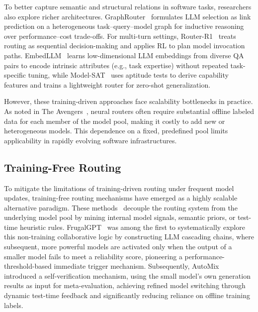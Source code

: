 \documentclass[acmsmall,screen,review,anonymous]{acmart}
\begin{document}
To better capture semantic and structural relations in software tasks, researchers also explore richer architectures. GraphRouter~\cite{feng2024graphrouter}
formulates LLM selection as link prediction on a heterogeneous task--query--model graph for inductive reasoning over performance--cost trade-offs.
For multi-turn settings, Router-R1~\cite{zhang2025router} treats routing as sequential decision-making and applies RL to plan model invocation paths.
EmbedLLM~\cite{zhuang2024embedllm} learns low-dimensional LLM embeddings from diverse QA pairs to encode intrinsic attributes (e.g., task expertise)
without repeated task-specific tuning, while Model-SAT~\cite{zhang2025capability} uses aptitude tests to derive capability features and trains a lightweight
router for zero-shot generalization.

However, these training-driven approaches face scalability bottlenecks in practice. As noted in The Avengers~\cite{zhang2025avengers}, neural routers often
require substantial offline labeled data for each member of the model pool, making it costly to add new or heterogeneous models. This dependence on a fixed,
predefined pool limits applicability in rapidly evolving software infrastructures.

\subsection{Training-Free Routing}
To mitigate the limitations of training-driven routing under frequent model updates, training-free routing mechanisms have emerged as a highly scalable alternative paradigm. These methods~\cite{wu2025efficient,guha2024smoothie,chen2025tagrouter} decouple the routing system from the underlying model pool by mining internal model signals, semantic priors, or test-time heuristic rules. FrugalGPT~\cite{chen2023frugalgpt} was among the first to systematically explore this non-training collaborative logic by constructing LLM cascading chains, where subsequent, more powerful models are activated only when the output of a smaller model fails to meet a reliability score, pioneering a performance-threshold-based immediate trigger mechanism. Subsequently, AutoMix~\cite{aggarwal2024automix} introduced a self-verification mechanism, using the small model's own generation results as input for meta-evaluation, achieving refined model switching through dynamic test-time feedback and significantly reducing reliance on offline training labels.
\end{document}
